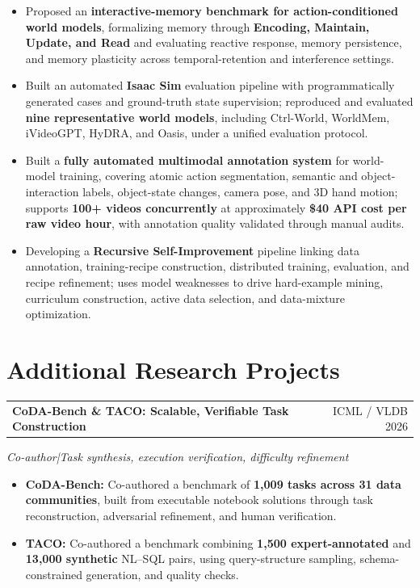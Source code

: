 \documentclass[a4paper,10pt]{article}
\makeatletter
\newcommand{\project}[3]{%
  \needspace{5\baselineskip}\vspace{3pt}
  \begin{tabularx}{\linewidth}{@{}Xr@{}}
  \textbf{#1} & {\small\color{navy}#2}
  \end{tabularx}\par
  {\small\itshape\color{muted}#3}\par
}
\makeatother
\begin{document}
\begin{itemize}
  \item Proposed an \textbf{interactive-memory benchmark for action-conditioned world models}, formalizing memory through \textbf{Encoding, Maintain, Update, and Read} and evaluating reactive response, memory persistence, and memory plasticity across temporal-retention and interference settings.

  \item Built an automated \textbf{Isaac Sim} evaluation pipeline with programmatically generated cases and ground-truth state supervision; reproduced and evaluated \textbf{nine representative world models}, including Ctrl-World, WorldMem, iVideoGPT, HyDRA, and Oasis, under a unified evaluation protocol.

  \item Built a \textbf{fully automated multimodal annotation system} for world-model training, covering atomic action segmentation, semantic and object-interaction labels, object-state changes, camera pose, and 3D hand motion; supports \textbf{100+ videos concurrently} at approximately \textbf{\$40 API cost per raw video hour}, with annotation quality validated through manual audits.

  \item Developing a \textbf{Recursive Self-Improvement} pipeline linking data annotation, training-recipe construction, distributed training, evaluation, and recipe refinement; uses model weaknesses to drive hard-example mining, curriculum construction, active data selection, and data-mixture optimization.
\end{itemize}


\section{Additional Research Projects}

\project{CoDA-Bench \& TACO: Scalable, Verifiable Task Construction}{ICML / VLDB 2026}
{Co-author\quad|\quad Task synthesis, execution verification, difficulty refinement}

\begin{itemize}
  \item \textbf{CoDA-Bench:} Co-authored a benchmark of \textbf{1,009 tasks across 31 data communities}, built from executable notebook solutions through task reconstruction, adversarial refinement, and human verification.
  \item \textbf{TACO:} Co-authored a benchmark combining \textbf{1,500 expert-annotated} and \textbf{13,000 synthetic} NL--SQL pairs, using query-structure sampling, schema-constrained generation, and quality checks.
\end{itemize}
\end{document}
